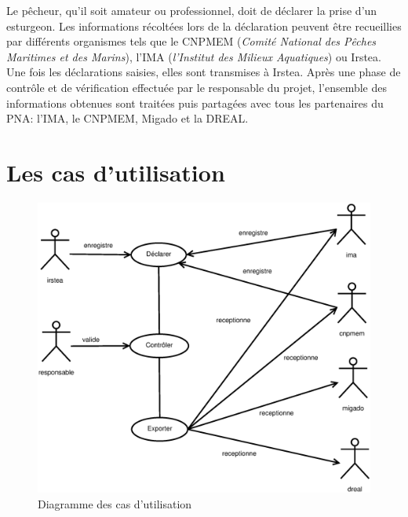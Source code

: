 \documentclass[12pt,a4paper]{article}
\begin{document}
Le pêcheur, qu'il soit amateur ou professionnel, doit de déclarer la prise d'un esturgeon. Les informations récoltées  lors de la déclaration peuvent être recueillies par différents organismes tels que le CNPMEM (\textit{Comité National des Pêches Maritimes et des  Marins}), l'IMA (\textit{l'Institut des Milieux Aquatiques}) ou Irstea. Une fois les déclarations saisies, elles sont transmises à Irstea. Après une phase de contrôle et de vérification effectuée par le responsable du projet, l'ensemble des informations obtenues sont traitées puis partagées avec tous les partenaires du PNA: l'IMA, le CNPMEM, Migado et la DREAL.
\clearpage

\section{Les cas d'utilisation}
\begin{figure}[h]
\centering
\includegraphics[width=\textwidth]{casUtilisation2.eps}
\caption{Diagramme des cas d'utilisation}
\end{figure}
\clearpage
\end{document}
